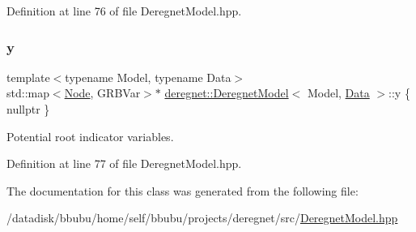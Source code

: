 Definition at line 76 of file Deregnet\+Model.\+hpp.

\mbox{\label{classderegnet_1_1DeregnetModel_ae76df61afe302b939165facf3dd21ac8}} 
\subsubsection{\texorpdfstring{y}{y}}
{\footnotesize\ttfamily template$<$typename Model, typename Data$>$ \\
std\+::map$<$\hyperlink{namespacederegnet_a744bad34f2de9856d36715a445f027f3}{Node}, G\+R\+B\+Var$>$$\ast$ \hyperlink{classderegnet_1_1DeregnetModel}{deregnet\+::\+Deregnet\+Model}$<$ Model, \hyperlink{avgdrgnt_8cpp_a1d1235306db276e9b36acba1db1509e8}{Data} $>$\+::y \{ nullptr \}\hspace{0.3cm}{\ttfamily [protected]}}



Potential \textquotesingle{}root\textquotesingle{} indicator variables. 



Definition at line 77 of file Deregnet\+Model.\+hpp.



The documentation for this class was generated from the following file\+:\begin{DoxyCompactItemize}
\item 
/datadisk/bbubu/home/self/bbubu/projects/deregnet/src/\hyperlink{DeregnetModel_8hpp}{Deregnet\+Model.\+hpp}\end{DoxyCompactItemize}
